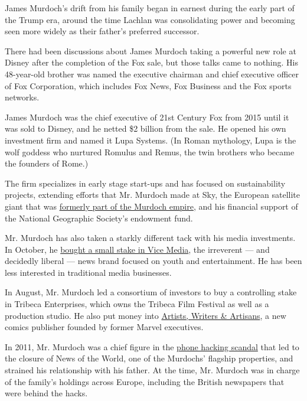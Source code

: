 James Murdoch's drift from his family began in earnest during the early
part of the Trump era, around the time Lachlan was consolidating power
and becoming seen more widely as their father's preferred successor.

There had been discussions about James Murdoch taking a powerful new
role at Disney after the completion of the Fox sale, but those talks
came to nothing. His 48-year-old brother was named the executive
chairman and chief executive officer of Fox Corporation, which includes
Fox News, Fox Business and the Fox sports networks.

James Murdoch was the chief executive of 21st Century Fox from 2015
until it was sold to Disney, and he netted \$2 billion from the sale. He
opened his own investment firm and named it Lupa Systems. (In Roman
mythology, Lupa is the wolf goddess who nurtured Romulus and Remus, the
twin brothers who became the founders of Rome.)

The firm specializes in early stage start-ups and has focused on
sustainability projects, extending efforts that Mr. Murdoch made at Sky,
the European satellite giant that was
\href{https://www.bbc.com/news/business-45654792}{formerly part of the
Murdoch empire}, and his financial support of the National Geographic
Society's endowment fund.

Mr. Murdoch has also taken a starkly different tack with his media
investments. In October, he
\href{https://www.nytimes3xbfgragh.onion/2019/10/10/business/media/james-murdoch-vice-media.html}{bought
a small stake in Vice Media}, the irreverent --- and decidedly liberal
--- news brand focused on youth and entertainment. He has been less
interested in traditional media businesses.

In August, Mr. Murdoch led a consortium of investors to buy a
controlling stake in Tribeca Enterprises, which owns the Tribeca Film
Festival as well as a production studio. He also put money into
\href{https://www.nytimes3xbfgragh.onion/2019/03/20/arts/awa-comic-books-publisher.html}{Artists,
Writers \& Artisans}, a new comics publisher founded by former Marvel
executives.

In 2011, Mr. Murdoch was a chief figure in the
\href{https://www.nytimes3xbfgragh.onion/topic/organization/british-phone-hacking-scandal-leveson-report}{phone
hacking scandal} that led to the closure of News of the World, one of
the Murdochs' flagship properties, and strained his relationship with
his father. At the time, Mr. Murdoch was in charge of the family's
holdings across Europe, including the British newspapers that were
behind the hacks.

